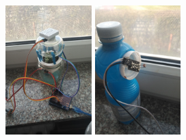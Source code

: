 \documentclass[a4paper,11pt]{uzreport}
\begin{document}
\begin{multicols}{3}
	     \includegraphics[width=.9\columnwidth,height=5cm,keepaspectratio]{listings/miejscetestowe.jpg}
		 \includegraphics[width=.9\columnwidth,height=5cm,keepaspectratio]{listings/czujnikswiatla.jpg}
\end{multicols}
\end{document}
